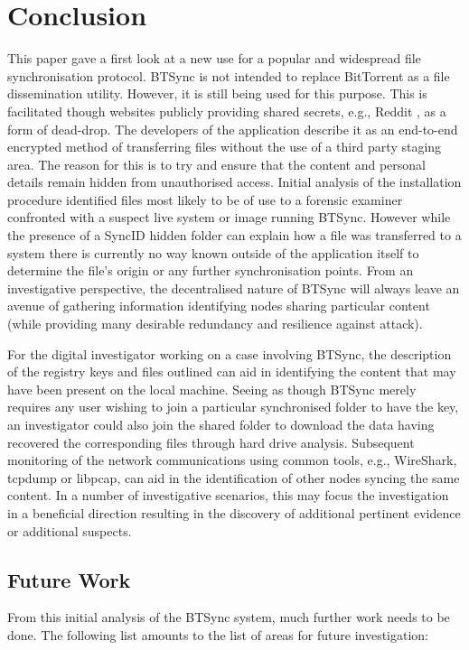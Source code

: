 \documentclass[final,5p,times,twocolumn]{elsarticle}
\begin{document}
\section{Conclusion}
\label{conclusion}


This paper gave a first look at a new use for a popular and widespread file synchronisation protocol. BTSync is not intended to replace BitTorrent as a file dissemination utility. However, it is still being used for this purpose. This is facilitated though websites publicly providing shared secrets, e.g., Reddit \cite{reddit}, as a form of dead-drop. The developers of the application describe it as an end-to-end encrypted method of transferring files without the use of a third party staging area. The reason for this is to try and ensure that the content and personal details remain hidden from unauthorised access. Initial analysis of the installation procedure identified files most likely to be of use to a forensic examiner confronted with a suspect live system or image running BTSync. However while the presence of a SyncID hidden folder can explain how a file was transferred to a system there is currently no way known outside of the application itself to determine the file's origin or any further synchronisation points. From an investigative perspective, the decentralised nature of BTSync will always leave an avenue of gathering information identifying nodes sharing particular content (while providing many desirable redundancy and resilience against attack).

For the digital investigator working on a case involving BTSync, the description of the registry keys and files outlined can aid in identifying the content that may have been present on the local machine. Seeing as though BTSync merely requires any user wishing to join a particular synchronised folder to have the key, an investigator could also join the shared folder to download the data having recovered the corresponding files through hard drive analysis. Subsequent monitoring of the network communications using common tools, e.g., WireShark, tcpdump or libpcap, can aid in the identification of other nodes syncing the same content. In a number of investigative scenarios, this may focus the investigation in a beneficial direction resulting in the discovery of additional pertinent evidence or additional suspects.

\subsection{Future Work}
\label{futurework}
From this initial analysis of the BTSync system, much further work needs to be done. The following list amounts to the list of areas for future investigation:
\end{document}
